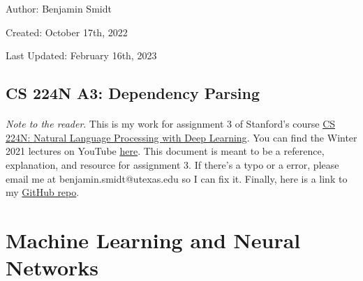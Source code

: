 \documentclass[12pt]{article}
\begin{document}
\noindent Author: Benjamin Smidt

\noindent Created: October 17th, 2022

\noindent Last Updated: February 16th, 2023
\begin{center}
\section*{CS 224N A3: Dependency Parsing}
\end{center}

\paragraph{} \emph{Note to the reader}. This is my work for assignment 3 of Stanford's course
\href{https://web.stanford.edu/class/cs224n/}{CS 224N: Natural Language Processing with Deep Learning}. 
You can find the Winter 2021 lectures on YouTube \href{https://www.youtube.com/playlist?list=PLoROMvodv4rOSH4v6133s9LFPRHjEmbmJ}{here}.
This document is meant to be a reference, explanation, and resource for assignment 3. 
If there's a typo or a error, please email me at benjamin.smidt@utexas.edu so I can fix it. 
Finally, here is a link to my \href{https://github.com/bensmidt/CS224N-DL-NLP}{GitHub repo}. 

\tableofcontents{}

\newpage

\section{Machine Learning and Neural Networks}
\end{document}
